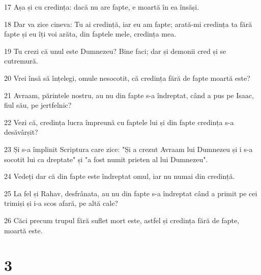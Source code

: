 \par 17 Așa și cu credința: dacă nu are fapte, e moartă în ea însăși.
\par 18 Dar va zice cineva: Tu ai credință, iar eu am fapte; arată-mi credința ta fără fapte și eu îți voi arăta, din faptele mele, credința mea.
\par 19 Tu crezi că unul este Dumnezeu? Bine faci; dar și demonii cred și se cutremură.
\par 20 Vrei însă să înțelegi, omule nesocotit, că credința fără de fapte moartă este?
\par 21 Avraam, părintele nostru, au nu din fapte s-a îndreptat, când a pus pe Isaac, fiul său, pe jertfelnic?
\par 22 Vezi că, credința lucra împreună cu faptele lui și din fapte credința s-a desăvârșit?
\par 23 Și s-a împlinit Scriptura care zice: "Și a crezut Avraam lui Dumnezeu și i s-a socotit lui ca dreptate" și "a fost numit prieten al lui Dumnezeu".
\par 24 Vedeți dar că din fapte este îndreptat omul, iar nu numai din credință.
\par 25 La fel și Rahav, desfrânata, au nu din fapte s-a îndreptat când a primit pe cei trimiși și i-a scos afară, pe altă cale?
\par 26 Căci precum trupul fără suflet mort este, astfel și credința fără de fapte, moartă este.

\chapter{3}

